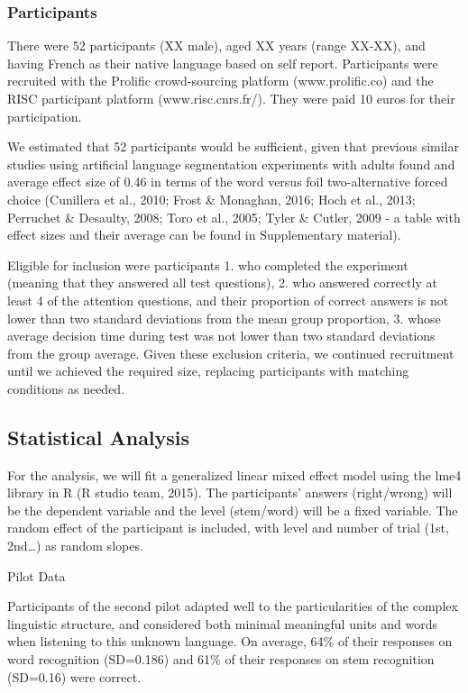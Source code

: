 \documentclass[
  american,
  ,man,floatsintext]{apa6}
\begin{document}
\hypertarget{participants}{%
\subsubsection{Participants}\label{participants}}

There were 52 participants (XX male), aged XX years (range XX-XX), and having French as their native language based on self report. Participants were recruited with the Prolific crowd-sourcing platform (www.prolific.co) and the RISC participant platform (www.risc.cnrs.fr/). They were paid 10 euros for their participation.

We estimated that 52 participants would be sufficient, given that previous similar studies using artificial language segmentation experiments with adults found and average effect size of 0.46 in terms of the word versus foil two-alternative forced choice (Cunillera et al., 2010; Frost \& Monaghan, 2016; Hoch et al., 2013; Perruchet \& Desaulty, 2008; Toro et al., 2005; Tyler \& Cutler, 2009 - a table with effect sizes and their average can be found in Supplementary material).

Eligible for inclusion were participants 1. who completed the experiment (meaning that they answered all test questions), 2. who answered correctly at least 4 of the attention questions, and their proportion of correct answers is not lower than two standard deviations from the mean group proportion, 3. whose average decision time during test was not lower than two standard deviations from the group average. Given these exclusion criteria, we continued recruitment until we achieved the required size, replacing participants with matching conditions as needed.

\hypertarget{statistical-analysis}{%
\subsection{Statistical Analysis}\label{statistical-analysis}}

For the analysis, we will fit a generalized linear mixed effect model using the lme4 library in R (R studio team, 2015). The participants' answers (right/wrong) will be the dependent variable and the level (stem/word) will be a fixed variable. The random effect of the participant is included, with level and number of trial (1st, 2nd\ldots) as random slopes.

Pilot Data

Participants of the second pilot adapted well to the particularities of the complex linguistic structure, and considered both minimal meaningful units and words when listening to this unknown language. On average, 64\% of their responses on word recognition (SD=0.186) and 61\% of their responses on stem recognition (SD=0.16) were correct.
\end{document}
